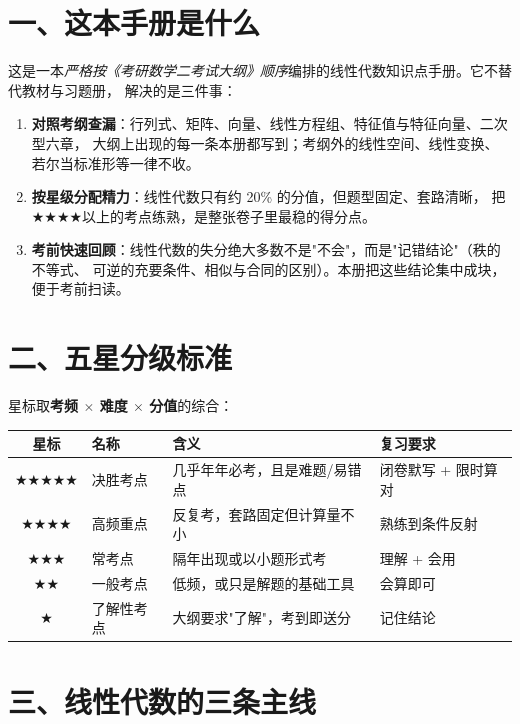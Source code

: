 \section*{一、这本手册是什么}

这是一本\emph{严格按《考研数学二考试大纲》顺序}编排的线性代数知识点手册。它不替代教材与习题册，
解决的是三件事：

\begin{enumerate}
  \item \textbf{对照考纲查漏}：行列式、矩阵、向量、线性方程组、特征值与特征向量、二次型六章，
        大纲上出现的每一条本册都写到；考纲外的线性空间、线性变换、若尔当标准形等一律不收。
  \item \textbf{按星级分配精力}：线性代数只有约 20\% 的分值，但题型固定、套路清晰，
        把$\bigstar\bigstar\bigstar\bigstar$以上的考点练熟，是整张卷子里最稳的得分点。
  \item \textbf{考前快速回顾}：线性代数的失分绝大多数不是"不会"，而是"记错结论"（秩的不等式、
        可逆的充要条件、相似与合同的区别）。本册把这些结论集中成块，便于考前扫读。
\end{enumerate}

\section*{二、五星分级标准}

星标取\textbf{考频 $\times$ 难度 $\times$ 分值}的综合：

\begin{center}
\begin{tabular}{@{}clll@{}}
\toprule
\textbf{星标} & \textbf{名称} & \textbf{含义} & \textbf{复习要求} \\
\midrule
$\bigstar\bigstar\bigstar\bigstar\bigstar$ & 决胜考点 & 几乎年年必考，且是难题/易错点 & 闭卷默写 + 限时算对 \\
$\bigstar\bigstar\bigstar\bigstar$ & 高频重点 & 反复考，套路固定但计算量不小 & 熟练到条件反射 \\
$\bigstar\bigstar\bigstar$ & 常考点 & 隔年出现或以小题形式考 & 理解 + 会用 \\
$\bigstar\bigstar$ & 一般考点 & 低频，或只是解题的基础工具 & 会算即可 \\
$\bigstar$ & 了解性考点 & 大纲要求"了解"，考到即送分 & 记住结论 \\
\bottomrule
\end{tabular}
\end{center}

\section*{三、线性代数的三条主线}

